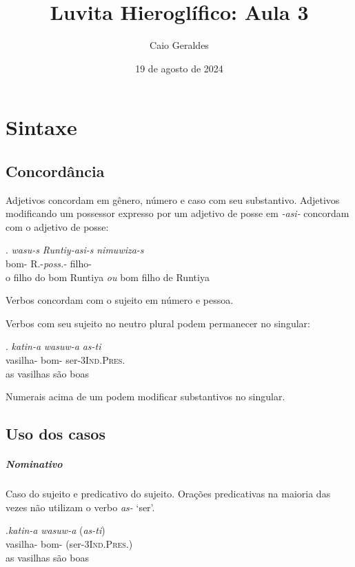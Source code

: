 \documentclass{luvita}
\title{Luvita Hieroglífico: Aula 3}
\author{Caio Geraldes}
\date{19 de agosto de 2024}
\begin{document}
\frontmatter

\mainmatter%

\maketitle

\chapter{Sintaxe}

\section{Concordância}

Adjetivos concordam em gênero, número e caso com seu
substantivo.
Adjetivos modificando um possessor expresso por um adjetivo de posse em
\emph{-asi-} concordam com o adjetivo de posse:

\exg. \emph{wasu-s} \emph{Runtiy-asi-s} \emph{nimuwiza-s}\\
bom-\Nom\Sg\Com{} R.-\emph{poss.}-\Nom\Sg\Com{} filho-\Nom{}\Sg\Com{}\\
o filho do bom Runtiya \emph{ou} bom filho de Runtiya


\noindent Verbos concordam com o sujeito em número e pessoa.

Verbos com seu sujeito no neutro plural podem permanecer no singular:

\exg. \emph{katin-a} \emph{wasuw-a} \emph{as-ti}\\
vasilha-\Nom\Pl\Neut{} bom-\Nom\Pl\Neut{} ser-3\Sg\textsc{Ind.Pres.}\\
as vasilhas são boas


\noindent Numerais acima de um podem modificar substantivos no singular.


\section{Uso dos casos}

\paragraph{Nominativo}
Caso do sujeito e predicativo do sujeito.
Orações predicativas na maioria das vezes não utilizam o verbo \emph{as-} `ser'.

\exg.\emph{katin-a} \emph{wasuw-a} (\emph{as-ti})\\
vasilha-\Nom\Pl\Neut{} bom-\Nom\Pl\Neut{} (ser-3\Sg\textsc{Ind.Pres.})\\
as vasilhas são boas
\end{document}
